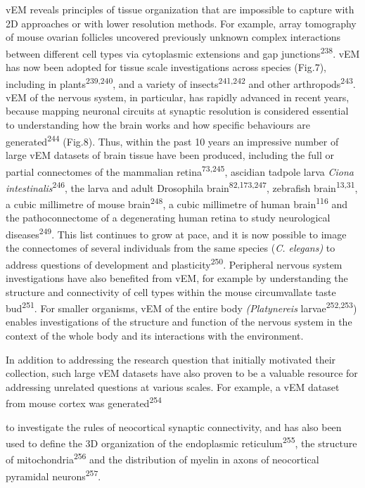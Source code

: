 \documentclass{article}
\begin{document}
vEM reveals principles of tissue organization that are impossible to capture with 2D approaches or with lower resolution methods. For example, array tomography of mouse ovarian follicles uncovered previously unknown complex interactions between different cell types via cytoplasmic extensions and gap junctions\textsuperscript{238}. vEM has now been adopted for tissue scale investigations across species (Fig.7), including in plants\textsuperscript{239,240}, and a variety of insects\textsuperscript{241,242} and other arthropods\textsuperscript{243}. vEM of the nervous system, in particular, has rapidly advanced in recent years, because mapping neuronal circuits at synaptic resolution is considered essential to understanding how the brain works and how specific behaviours are generated\textsuperscript{244} (Fig.8). Thus, within the past 10 years an impressive number of large vEM datasets of brain tissue have been produced, including the full or partial connectomes of the mammalian retina\textsuperscript{73,245}, ascidian tadpole larva \emph{Ciona intestinalis}\textsuperscript{246}, the larva and adult Drosophila brain\textsuperscript{82,173,247}, zebrafish brain\textsuperscript{13,31}, a cubic millimetre of mouse brain\textsuperscript{248}, a cubic millimetre of human brain\textsuperscript{116} and the pathoconnectome of a degenerating human retina to study neurological diseases\textsuperscript{249}. This list continues to grow at pace, and it is now possible to image the connectomes of several individuals from the same species (\emph{C. elegans)} to address questions of development and plasticity\textsuperscript{250}. Peripheral nervous system investigations have also benefited from vEM, for example by understanding the structure and connectivity of cell types within the mouse circumvallate taste bud\textsuperscript{251}. For smaller organisms, vEM of the entire body \emph{(Platynereis} larvae\textsuperscript{252,253}) enables investigations of the structure and function of the nervous system in the context of the whole body and its interactions with the environment.

In addition to addressing the research question that initially motivated their collection, such large vEM datasets have also proven to be a valuable resource for addressing unrelated questions at various scales. For example, a vEM dataset from mouse cortex was generated\textsuperscript{254}

to investigate the rules of neocortical synaptic connectivity, and has also been used to define the 3D organization of the endoplasmic reticulum\textsuperscript{255}, the structure of mitochondria\textsuperscript{256} and the distribution of myelin in axons of neocortical pyramidal neurons\textsuperscript{257}.
\end{document}

